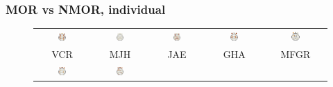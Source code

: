 \documentclass[serif,mathserif,professionalfont]{beamer}
\begin{document}
\begin{frame}\frametitle{MOR vs NMOR, individual}
\begin{figure}
\centering
\begin{tabular}{ccccc}
\includegraphics[width=0.15\textwidth]{./img_art_dfa/cabeza_new_VCR_30.pdf} &
\includegraphics[width=0.15\textwidth]{./img_art_dfa/cabeza_new_MJH_30.pdf} &
\includegraphics[width=0.15\textwidth]{./img_art_dfa/cabeza_new_JAE_30.pdf} &
\includegraphics[width=0.15\textwidth]{./img_art_dfa/cabeza_new_GHA_30.pdf} &
\includegraphics[width=0.15\textwidth]{./img_art_dfa/cabeza_new_MFGR_30.pdf} \\
VCR & MJH & JAE & GHA & MFGR \\
\includegraphics[width=0.15\textwidth]{./img_art_dfa/cabeza_new_CLO_30.pdf} &
\includegraphics[width=0.15\textwidth]{./img_art_dfa/cabeza_new_RLO_30.pdf} &

\end{tabular}
\end{figure}
\end{frame}
\end{document}
